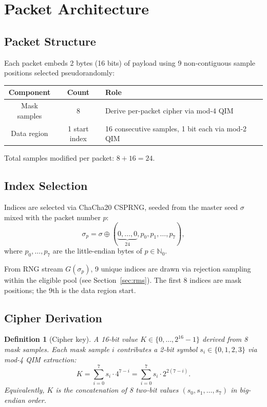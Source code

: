 \documentclass[11pt,a4paper]{article}
\newtheorem{definition}[theorem]{Definition}
\newcommand{\N}{\mathbb{N}}
\newcommand{\xor}{\oplus}
\begin{document}
\section{Packet Architecture}
\label{sec:packet}

\subsection{Packet Structure}

Each packet embeds 2 bytes (16 bits) of payload using 9 non-contiguous
sample positions selected pseudorandomly:

\begin{center}
\begin{tabular}{@{}ccl@{}}
\toprule
Component & Count & Role \\
\midrule
Mask samples & 8 & Derive per-packet cipher via mod-4 QIM \\
Data region & 1 start index & 16 consecutive samples, 1 bit each via mod-2 QIM \\
\bottomrule
\end{tabular}
\end{center}

Total samples modified per packet: $8 + 16 = 24$.

\subsection{Index Selection}

Indices are selected via ChaCha20 CSPRNG, seeded from the master seed
$\sigma$ mixed with the packet number $p$:
\[
    \sigma_p = \sigma \xor (\underbrace{0, \ldots, 0}_{24}, p_0, p_1, \ldots, p_7),
\]
where $p_0, \ldots, p_7$ are the little-endian bytes of $p \in \N_0$.

From RNG stream $G(\sigma_p)$, 9 unique indices are drawn via rejection
sampling within the eligible pool (see Section~\ref{sec:rms}).  The first
8 indices are mask positions; the 9th is the data region start.

\subsection{Cipher Derivation}
\label{sec:cipher}

\begin{definition}[Cipher key]
A 16-bit value $K \in \{0, \ldots, 2^{16}-1\}$ derived from 8 mask samples.
Each mask sample $i$ contributes a 2-bit symbol $s_i \in \{0,1,2,3\}$
via mod-4 QIM extraction:
\[
    K = \sum_{i=0}^{7} s_i \cdot 4^{7-i}
      = \sum_{i=0}^{7} s_i \cdot 2^{2(7-i)}.
\]
Equivalently, $K$ is the concatenation of 8 two-bit values
$(s_0, s_1, \ldots, s_7)$ in big-endian order.
\end{definition}
\end{document}
